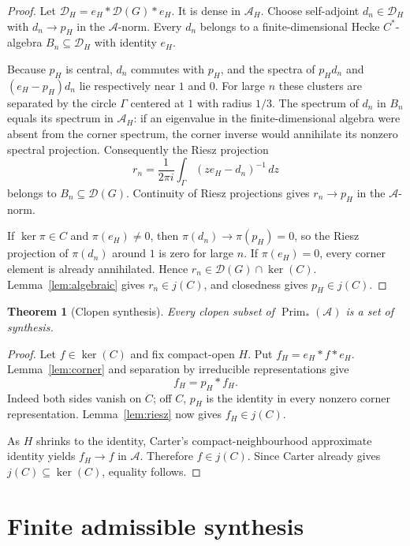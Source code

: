 \documentclass[11pt]{article}
\newtheorem{theorem}{Theorem}
\newcommand{\A}{\mathcal A}
\newcommand{\D}{\mathcal D}
\newcommand{\Prim}{\operatorname{Prim}}
\begin{document}
\begin{proof}
Let $\D_H=e_H*\D(G)*e_H$.  It is dense in $\A_H$.  Choose self-adjoint
$d_n\in\D_H$ with $d_n\to p_H$ in the $\A$-norm.  Every $d_n$ belongs to a
finite-dimensional Hecke $C^*$-algebra $B_n\subseteq\D_H$ with identity
$e_H$.

Because $p_H$ is central, $d_n$ commutes with $p_H$, and the spectra of
$p_Hd_n$ and $(e_H-p_H)d_n$ lie respectively near $1$ and $0$.  For large
$n$ these clusters are separated by the circle $\Gamma$ centered at $1$ with
radius $1/3$.  The spectrum of $d_n$ in $B_n$ equals its spectrum in
$\A_H$: if an eigenvalue in the finite-dimensional algebra were absent from
the corner spectrum, the corner inverse would annihilate its nonzero spectral
projection.  Consequently the Riesz projection
\[
 r_n=\frac{1}{2\pi i}\int_\Gamma(ze_H-d_n)^{-1}\,dz
\]
belongs to $B_n\subseteq\D(G)$.  Continuity of Riesz projections gives
$r_n\to p_H$ in the $\A$-norm.

If $\ker\pi\in C$ and $\pi(e_H)\ne0$, then
$\pi(d_n)\to\pi(p_H)=0$, so the Riesz projection of $\pi(d_n)$ around
$1$ is zero for large $n$.  If $\pi(e_H)=0$, every corner element is already
annihilated.  Hence $r_n\in\D(G)\cap\ker(C)$.  Lemma~\ref{lem:algebraic}
gives $r_n\in j(C)$, and closedness gives $p_H\in j(C)$.
\end{proof}

\begin{theorem}[Clopen synthesis]\label{thm:clopen}
Every clopen subset of $\Prim_*(\A)$ is a set of synthesis.
\end{theorem}

\begin{proof}
Let $f\in\ker(C)$ and fix compact-open $H$.  Put
$f_H=e_H*f*e_H$.  Lemma~\ref{lem:corner} and separation by irreducible
representations give
\[
 f_H=p_H*f_H.
\]
Indeed both sides vanish on $C$; off $C$, $p_H$ is the identity in every
nonzero corner representation.  Lemma~\ref{lem:riesz} now gives
$f_H\in j(C)$.

As $H$ shrinks to the identity, Carter's compact-neighbourhood approximate
identity \cite[Proposition 2.16(ii)]{Carter} yields $f_H\to f$ in $\A$.
Therefore $f\in j(C)$.  Since Carter already gives
$j(C)\subseteq\ker(C)$, equality follows.
\end{proof}

\section{Finite admissible synthesis}
\end{document}
